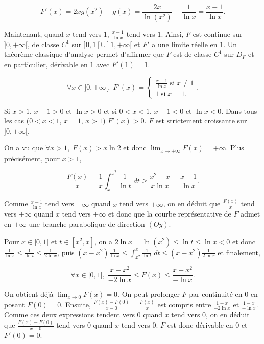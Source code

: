 \documentclass[11pt,a4paper]{article}
\begin{document}
\begin{enumerate}
$$F'(x)=2xg(x^2)-g(x)=\frac{2x}{\ln(x^2)}-\frac{1}{\ln x}=\frac{x-1}{\ln x}.$$

Maintenant, quand $x$ tend vers $1$, $\frac{x-1}{\ln x}$ tend vers $1$. Ainsi, $F$ est continue sur $]0,+\infty[$, de classe $C^1$ sur $]0,1[\cup]1,+\infty[$ et $F'$ a une limite réelle en $1$. Un théorème classique d'analyse permet d'affirmer que  $F$ est de classe $C^1$ sur $D_F$ et en particulier, dérivable en $1$ avec $F'(1)=1$.

$$\forall x\in]0,+\infty[,\;F'(x)=\left\{
\begin{array}{l}
\frac{x-1}{\ln x}\;\mbox{si}\;x\neq1\\
1\;\mbox{si}\;x=1.
\end{array}
\right..$$

Si $x>1$, $x-1>0$ et $\ln x>0$ et si $0<x<1$, $x-1<0$ et $\ln x<0$. Dans tous les cas ($0<x<1$, $x=1$, $x>1$)  $F'(x)>0$. $F$ est strictement croissante sur $]0,+\infty[$.

On a vu que $\forall x>1,\;F(x)>x\ln2$ et donc $\lim_{x\rightarrow +\infty}F(x)=+\infty$. Plus précisément, pour $x>1$,

$$\frac{F(x)}{x}=\frac{1}{x}\int_{x}^{x^2}\frac{1}{\ln t}\;dt\geq\frac{x^2-x}{x\ln x}=\frac{x-1}{\ln x}.$$

Comme $\frac{x-1}{\ln x}$ tend vers $+\infty$ quand $x$ tend vers $+\infty$, on en déduit que $\frac{F(x)}{x}$ tend vers $+\infty$ quand $x$ tend vers $+\infty$ et donc que la courbe représentative de $F$ admet en $+\infty$ une branche parabolique de direction $(Oy)$.

Pour $x\in]0,1[$ et $t\in[x^2,x]$, on a $2\ln x=\ln(x^2)\leq\ln t\leq\ln x<0$ et donc $\frac{1}{\ln x}\leq\frac{1}{\ln t}\leq\frac{1}{2\ln x}$, puis $(x-x^2)\frac{1}{\ln x}\leq\int_{x^2}^{x}\frac{1}{\ln t}\;dt\leq(x-x^2)\frac{1}{2\ln x}$ et finalement,

$$\forall x\in]0,1[,\;\frac{x-x^2}{-2\ln x}\leq F(x)\leq\frac{x-x^2}{-\ln x}.$$

On obtient déjà $\lim_{x\rightarrow 0}F(x)=0$. On peut prolonger $F$ par continuité en $0$ en posant $F(0)=0$. Ensuite, $\frac{F(x)-F(0)}{x-0}=\frac{F(x)}{x}$ est compris entre $\frac{1-x}{-2\ln x}$ et $\frac{1-x}{-\ln x}$. Comme ces deux expressions tendent vers $0$ quand $x$ tend vers $0$, on en déduit que $\frac{F(x)-F(0)}{x-0}$ tend vers $0$ quand $x$ tend vers $0$. $F$ est donc dérivable en $0$ et $F'(0)=0$.


\end{enumerate}
\end{document}
